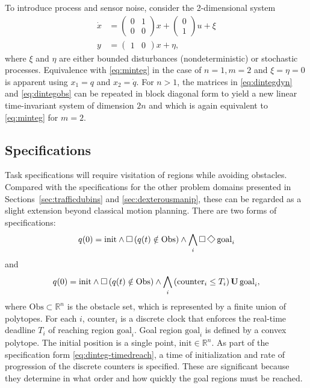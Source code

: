 \documentclass{amsart}
\theoremstyle{definition}
\begin{document}
To introduce process and sensor noise, consider the 2-dimensional system
\begin{align}
\dot{x} &= \left(
\begin{array}{cc}
0 & 1 \\
0 & 0
\end{array}
\right) x + \left(
\begin{array}{c}
0 \\
1
\end{array}
\right) u + \xi \label{eq:dintegdyn}\\
y &= \left(
\begin{array}{cc}
1 & 0
\end{array}
\right) x + \eta \label{eq:dintegobs},
\end{align}
where $\xi$ and $\eta$ are either bounded disturbances (nondeterministic) or
stochastic processes.  Equivalence with \eqref{eq:minteg} in the case of
$n=1, m=2$ and $\xi=\eta=0$ is apparent using $x_1 = q$ and $x_2 = \dot{q}$.  For $n
> 1$, the matrices in \eqref{eq:dintegdyn} and \eqref{eq:dintegobs} can be
repeated in block diagonal form to yield a new linear time-invariant system of
dimension $2n$ and which is again equivalent to \eqref{eq:minteg} for $m=2$.

\subsection{Specifications}

Task specifications will require visitation of regions while avoiding obstacles.
Compared with the specifications for the other problem domains presented in
Sections~\ref{sec:trafficdubins} and \ref{sec:dexterousmanip}, these can be
regarded as a slight extension beyond classical motion planning.  There are two
forms of specifications:
\begin{equation}\label{eq:dinteg-surveillance}
q(0) = \mathrm{init} \wedge \Galways \left( q(t) \notin \mathrm{Obs} \right) \wedge \bigwedge_{i} \Galways \Feventually \mathrm{goal}_i
\end{equation}
and
\begin{equation}\label{eq:dinteg-timedreach}
q(0) = \mathrm{init} \wedge \operatorname{\Box} \left( q(t) \notin \mathrm{Obs} \right) \wedge \bigwedge_{i} \left( \mathrm{counter}_i \leq T_{i} \right) \operatorname{\mathbf{U}} \mathrm{goal}_i ,
\end{equation}
where $\mathrm{Obs} \subset \mathbb{R}^n$ is the obstacle set, which is
represented by a finite union of polytopes.  For each $i$, $\mathrm{counter}_i$
is a discrete clock that enforces the real-time deadline $T_i$ of reaching
region $\mathrm{goal}_i$.  Goal region $\mathrm{goal}_i$ is defined by a convex
polytope.  The initial position is a single point, $\mathrm{init}\in
\mathbb{R}^n$.  As part of the specification form \eqref{eq:dinteg-timedreach},
a time of initialization and rate of progression of the discrete counters is
specified.  These are significant because they determine in what order and how
quickly the goal regions must be reached.
\end{document}
